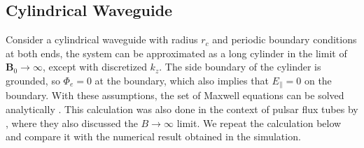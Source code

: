 \subsection{Cylindrical Waveguide}
\label{sec:test-dispersion}

Consider a cylindrical waveguide with radius $r_{c}$ and periodic boundary
conditions at both ends, the system can be approximated as a long cylinder in
the limit of $\mathbf{B}_0\to \infty$, except with discretized $k_{z}$. The side
boundary of the cylinder is grounded, so $\Phi_{e} = 0$ at the boundary, which
also implies that $E_{\parallel} = 0$ on the boundary. With
these assumptions, the set of Maxwell equations can be solved analytically
\citep[see e.g.][]{swanson_plasma_2003}.
This calculation was also done in the context of pulsar flux tubes by
\citet{arons_wave_1986}, where they also discussed the $B \to \infty$ limit. We
repeat the calculation below and compare it with the numerical result obtained
in the simulation.


